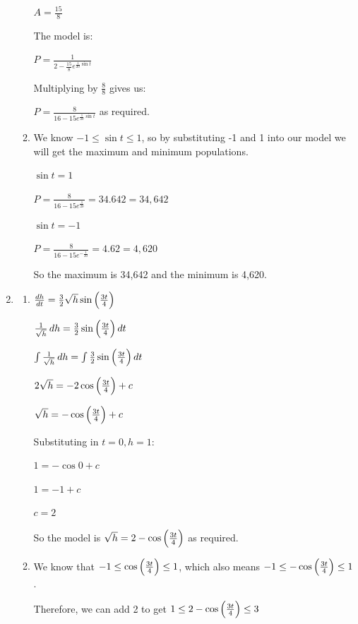 \documentclass[../main.tex]{subfiles}
\begin{document}
\begin{spacing}{1.5}
\begin{enumerate}[itemsep=0.7cm]
\begin{enumerate}[itemsep=0.5cm]
        $A=\frac{15}{8}$

        The model is:

        $P=\frac{1}{2-\frac{15}{8}e^{\frac{1}{20}\sin{t}}}$

        Multiplying by $\frac{8}{8}$ gives us:

        $P=\frac{8}{16-15e^{\frac{1}{20}\sin{t}}}$ as required.

        \item
        We know $-1\leq \sin{t} \leq 1$, so by substituting -1 and 1 into our model we will get the maximum and minimum populations.

        $\sin{t}=1$

        $P=\frac{8}{16-15e^{\frac{1}{20}}}=34.642 = 34,642$

        $\sin{t}=-1$

        $P=\frac{8}{16-15e^{-\frac{1}{20}}}=4.62 = 4,620$

        So the maximum is 34,642 and the minimum is 4,620.

        
    \end{enumerate}

    \item 
    \begin{enumerate}[itemsep=0.5cm]
        \item 
        $\frac{dh}{dt}=\frac{3}{2}\sqrt{h}\sin{\Bigl(\frac{3t}{4}\Bigr)}$

        $\frac{1}{\sqrt{h}}\,dh=\frac{3}{2}\sin{\Bigl(\frac{3t}{4}\Bigr)}\,dt$

        $\int \frac{1}{\sqrt{h}}\,dh=\int \frac{3}{2}\sin{\Bigl(\frac{3t}{4}\Bigr)}\,dt$

        $2\sqrt{h}=-2\cos{\Bigl(\frac{3t}{4}\Bigr)}+c$

        $\sqrt{h}=-\cos{\Bigl(\frac{3t}{4}\Bigr)}+c$

        Substituting in $t=0, h=1$:

        $1=-\cos{0}+c$

        $1=-1+c$

        $c=2$

        So the model is $\sqrt{h}=2-\cos{\Bigl(\frac{3t}{4}\Bigr)}$ as required.

        \item 
        We know that $-1 \leq \cos{\Bigl(\frac{3t}{4}\Bigr)}\leq 1$, which also means $-1 \leq -\cos{\Bigl(\frac{3t}{4}\Bigr)}\leq 1$.

        Therefore, we can add 2 to get $1 \leq 2-\cos{\Bigl(\frac{3t}{4}\Bigr)}\leq 3$


\end{enumerate}
\end{enumerate}
\end{spacing}
\end{document}
